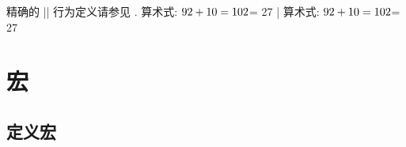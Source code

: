 精确的 |\afterassignment| 行为定义请参见 .
\example
\def\setme{\afterassignment\setmeA\count255}
\def\setmeA{$\number\count255\advance\count255 by 10
   +10=\number{}$}
算术式: \setme = 27
|
\produces
\def\setme{\afterassignment\setmeA\count255}
\def\setmeA{$\number\count255\advance\count255 by 10
   +10=\number{}$}
算术式: \setme = 27
\endexample
\enddesc


\section {宏}

\subsection {定义宏}

